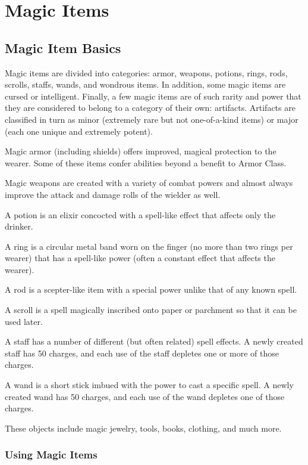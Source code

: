 \chapter{Magic Items}

\section{Magic Item Basics}
Magic items are divided into categories: armor, weapons, potions, rings, rods, scrolls, staffs, wands, and wondrous items. In addition, some magic items are cursed or intelligent. Finally, a few magic items are of such rarity and power that they are considered to belong to a category of their own: artifacts. Artifacts are classified in turn as minor (extremely rare but not one-of-a-kind items) or major (each one unique and extremely potent).

 Magic armor (including shields) offers improved, magical protection to the wearer. Some of these items confer abilities beyond a benefit to Armor Class.

 Magic weapons are created with a variety of combat powers and almost always improve the attack and damage rolls of the wielder as well.

 A potion is an elixir concocted with a spell-like effect that affects only the drinker.

 A ring is a circular metal band worn on the finger (no more than two rings per wearer) that has a spell-like power (often a constant effect that affects the wearer).

 A rod is a scepter-like item with a special power unlike that of any known spell.

 A scroll is a spell magically inscribed onto paper or parchment so that it can be used later.

 A staff has a number of different (but often related) spell effects. A newly created staff has 50 charges, and each use of the staff depletes one or more of those charges.

 A wand is a short stick imbued with the power to cast a specific spell. A newly created wand has 50 charges, and each use of the wand depletes one of those charges.

 These objects include magic jewelry, tools, books, clothing, and much more.

\subsection{Using Magic Items}

